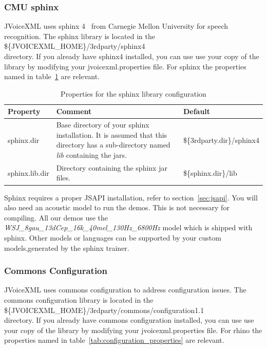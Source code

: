 \documentclass[11pt,a4paper]{article}
\begin{document}
\subsubsection{CMU sphinx}
\label{sec:cmu-sphinx}

JVoiceXML uses sphinx 4~\cite{sphinx} from Carnegie Mellon University
for speech recognition.
The sphinx library is located in the \\
\$\{JVOICEXML\_HOME\}/3rdparty/sphinx4 \\
directory. If you already have sphinx4 installed, you can use
use your copy of the library by modifying your jvoicexml.properties file.
For sphinx the properties named in table~\ref{tab:sphinx_properties} are 
relevant.

\begin{table}[h]
\caption{Properties for the sphinx library configuration}
\label{tab:sphinx_properties}

\begin{center}

\begin{tabular}{|l|p{4cm}|l|}
\hline
\textbf{Property} & \textbf{Comment} & \textbf{Default} \\
\hline
\hline
sphinx.dir & 
Base directory of your sphinx installation.
It is assumed that this directory
has a sub-directory named \emph{lib} containing the jars.
& \$\{3rdparty.dir\}/sphinx4 \\
\hline
sphinx.lib.dir & 
Directory containing the sphinx jar files.
& \$\{sphinx.dir\}/lib \\
\hline
\end{tabular}

\end{center}

\end{table}

Sphinx requires a proper JSAPI installation, refer to section~\ref{sec:jsapi}.
You will also need an acoustic model to run the demos. This is not
necessary for compiling. All our demos use the 
\emph{WSJ\_8gau\_13dCep\_16k\_40mel\_130Hz\_6800Hz} model which is shipped
with sphinx. Other models or languages can be supported by your
custom models,generated by the sphinx trainer.


\subsubsection{Commons Configuration}
\label{sec:comm-conf}

JVoiceXML uses commons configuration to address configuration
issues.
The commons configuration library is located in the \\
\$\{JVOICEXML\_HOME\}/3rdparty/commons/configuration1.1 \\
directory. If you already have commons configuration installed, you can use
use your copy of the library by modifying your jvoicexml.properties file.
For rhino the properties named in table~\ref{tab:configuration_properties} are 
relevant.
\end{document}
